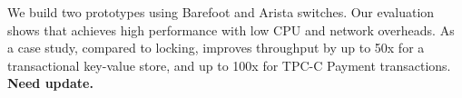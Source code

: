 We build two \sys prototypes using Barefoot and Arista switches.
Our evaluation shows that \sys achieves high performance with low CPU and network overheads.
As a case study, compared to locking, \sys improves throughput by up to 50x for a transactional key-value store, and up to 100x for TPC-C Payment transactions. \textbf{Need update.}







